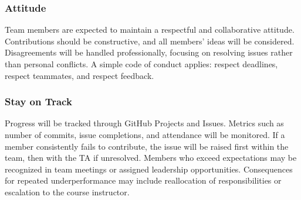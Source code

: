\documentclass{article}
\begin{document}
\subsubsection*{Attitude}

Team members are expected to maintain a respectful and collaborative attitude. Contributions 
should be constructive, and all members' ideas will be considered. Disagreements will be handled 
professionally, focusing on resolving issues rather than personal conflicts. A simple code of conduct 
applies: respect deadlines, respect teammates, and respect feedback.


\subsubsection*{Stay on Track}



Progress will be tracked through GitHub Projects and Issues. Metrics such as number of commits, 
issue completions, and attendance will be monitored. If a member consistently fails to contribute, 
the issue will be raised first within the team, then with the TA if unresolved. Members who 
exceed expectations may be recognized in team meetings or assigned leadership opportunities. 
Consequences for repeated underperformance may include reallocation of responsibilities 
or escalation to the course instructor.
\end{document}
